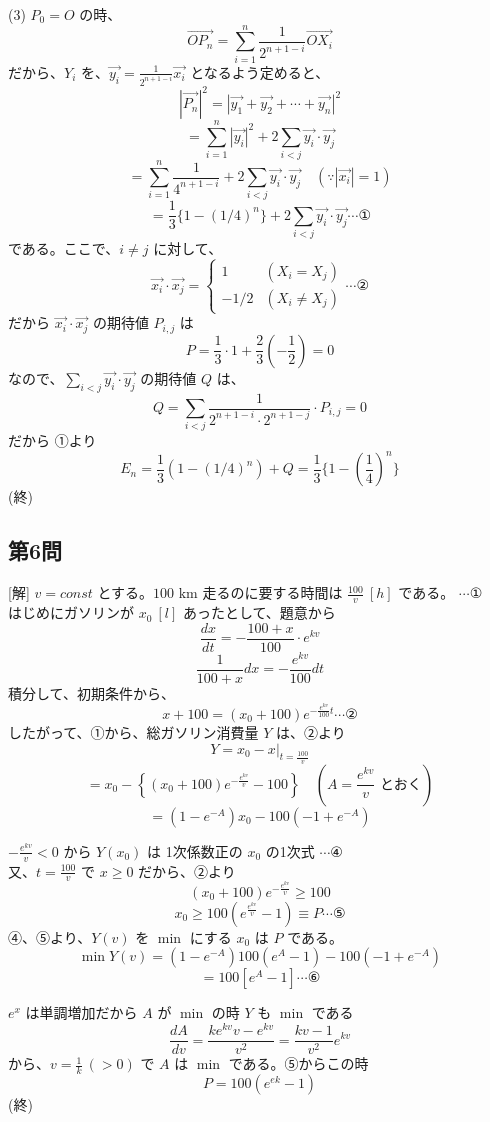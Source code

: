 \documentclass[../main.tex]{subfiles}
\begin{document}
(3) $P_0 = O$ の時、
\[ \overrightarrow{OP_n} = \sum_{i=1}^n \frac{1}{2^{n+1-i}} \overrightarrow{OX_i} \]
だから、$Y_i$ を、$\overrightarrow{y_i} = \frac{1}{2^{n+1-i}} \overrightarrow{x_i}$ となるよう定めると、
\[ |\overrightarrow{P_n}|^2 = |\overrightarrow{y_1} + \overrightarrow{y_2} + \cdots + \overrightarrow{y_n}|^2 \]
\[ = \sum_{i=1}^n |\overrightarrow{y_i}|^2 + 2 \sum_{i < j} \overrightarrow{y_i} \cdot \overrightarrow{y_j} \]
\[ = \sum_{i=1}^n \frac{1}{4^{n+1-i}} + 2 \sum_{i < j} \overrightarrow{y_i} \cdot \overrightarrow{y_j} \quad (\because |\overrightarrow{x_i}| = 1) \]
\[ = \frac{1}{3}\{1 - (1/4)^n\} + 2 \sum_{i < j} \overrightarrow{y_i} \cdot \overrightarrow{y_j} \cdots \text{①} \]
である。ここで、$i \ne j$ に対して、
\[ \overrightarrow{x_i} \cdot \overrightarrow{x_j} =
  \begin{cases} 1 & (X_i = X_j) \\ -1/2 & (X_i \ne X_j)
\end{cases} \cdots \text{②} \]
だから $\overrightarrow{x_i} \cdot \overrightarrow{x_j}$ の期待値 $P_{i,j}$ は
\[ P = \frac{1}{3} \cdot 1 + \frac{2}{3} \left(-\frac{1}{2}\right) = 0 \]
なので、$\sum_{i < j} \overrightarrow{y_i} \cdot \overrightarrow{y_j}$ の期待値 $Q$ は、
\[ Q = \sum_{i < j} \frac{1}{2^{n+1-i} \cdot 2^{n+1-j}} \cdot P_{i,j} = 0 \]
だから ①より
\[ E_n = \frac{1}{3}(1 - (1/4)^n) + Q = \frac{1}{3} \{ 1 - \left(\frac{1}{4}\right)^n \} \] \hfill(終)

\subsection*{第6問}
[解] $v = const$ とする。$100 \text{ km}$ 走るのに要する時間は $\frac{100}{v} \ [h]$ である。 $\cdots \text{①}$ \\
はじめにガソリンが $x_0 \ [l]$ あったとして、題意から
\[ \frac{dx}{dt} = - \frac{100 + x}{100} \cdot e^{kv} \]
\[ \frac{1}{100 + x} dx = - \frac{e^{kv}}{100} dt \]
積分して、初期条件から、
\[ x + 100 = (x_0 + 100)e^{-\frac{e^{kv}}{100}t} \cdots \text{②} \]
したがって、①から、総ガソリン消費量 $Y$ は、②より
\[ Y = x_0 - x|_{t=\frac{100}{v}} \]
\[ = x_0 - \left\{ (x_0+100) e^{-\frac{e^{kv}}{v}} - 100 \right\} \quad \left( A = \frac{e^{kv}}{v} \text{ とおく} \right) \]
\[ = (1 - e^{-A})x_0 - 100(-1 + e^{-A}) \]

$-\frac{e^{kv}}{v} < 0$ から $Y(x_0)$ は 1次係数正の $x_0$ の1次式 $\cdots \text{④}$ \\
又、$t = \frac{100}{v}$ で $x \ge 0$ だから、②より
\[ (x_0 + 100) e^{-\frac{e^{kv}}{v}} \ge 100 \]
\[ x_0 \ge 100(e^{\frac{e^{kv}}{v}} - 1) \equiv P \cdots \text{⑤} \]
④、⑤より、$Y(v)$ を $\min$ にする $x_0$ は $P$ である。
\[ \min Y(v) = (1 - e^{-A})100(e^A - 1) - 100(-1 + e^{-A}) \]
\[ = 100[e^A - 1] \cdots \text{⑥} \]

$e^x$ は単調増加だから $A$ が $\min$ の時 $Y$ も $\min$ である
\[ \frac{dA}{dv} = \frac{k e^{kv} v - e^{kv}}{v^2} = \frac{kv - 1}{v^2} e^{kv} \]
から、$v = \frac{1}{k} \ (>0)$ で $A$ は $\min$ である。⑤からこの時
\[ P = 100(e^{ek} - 1) \] \hfill(終)
\end{document}
